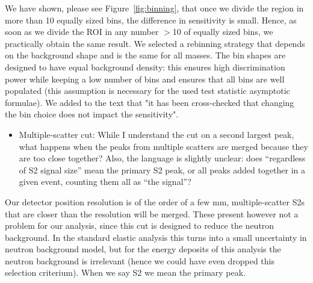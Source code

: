 \documentclass{article}
\begin{document}
We have shown, please see Figure~\ref{fig:binning}, that once we divide the region in more than 10 equally sized bins,
the difference in sensitivity is small. Hence, as soon as we divide the ROI in any number $>$10 of equally sized bins, we practically obtain the same result. 
We selected a rebinning strategy that depends on the background shape and is the same for all masses. The bin shapes are designed to have
equal background density: this ensures high discrimination power while keeping a low number of bins and ensures that all bins are 
well populated (this assumption is necessary for the used test statistic asymptotic formulae). 
We added to the text that "it has been cross-checked that changing the bin choice does not impact the sensitivity".


\begin{itemize}
	\item {\color{blue} 
Multiple-scatter cut: While I understand the cut on a second largest
peak, what happens when the peaks from multiple scatters are merged
because they are too close together? Also, the language is slightly
unclear: does “regardless of S2 signal size” mean the primary S2 peak,
or all peaks added together in a given event, counting them all as
“the signal”?}
\end{itemize}

Our detector position resolution is of the order of a few mm, multiple-scatter S2s that are 
closer than the resolution will be merged. These present however not a problem for our analysis, since this cut is designed 
to reduce the neutron background. In the standard elastic analysis this turns into a small
uncertainty in neutron background model, but for the energy deposits of this analysis the neutron background 
is irrelevant (hence we could have even dropped this selection criterium). When we say S2 we mean the primary peak. 
\end{document}
